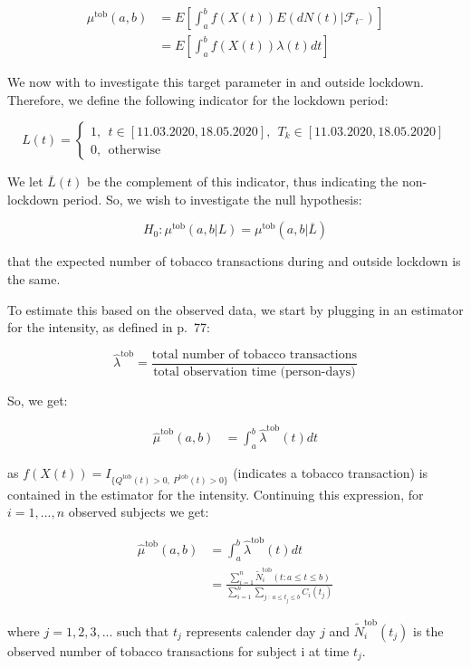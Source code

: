 \documentclass[
  11pt,
]{article}
\begin{document}
\begin{align*}
\mu^{\text{tob}}(a, b) &= E \left[\int_a^b f(X(t)) E(dN(t) | \mathcal{F}_{t^-}) \right] \\
&= E \left[\int_a^b f(X(t)) \lambda (t) dt \right]
\end{align*}

We now with to investigate this target parameter in and outside
lockdown. Therefore, we define the following indicator for the lockdown
period:

\[
L(t) = \begin{cases} 1, \ \  t\in [11.03.2020, 18.05.2020], \ \ T_k \in  [11.03.2020, 18.05.2020] \\
0, \ \ \text{otherwise}
\end{cases}
\]

We let \(\overline{L}(t)\) be the complement of this indicator, thus
indicating the non-lockdown period. So, we wish to investigate the null
hypothesis:

\[
H_0: \mu^{\text{tob}}(a,b | L)=\mu^{\text{tob}}(a,b | \overline{L})
\]

that the expected number of tobacco transactions during and outside
lockdown is the same.

To estimate this based on the observed data, we start by plugging in an
estimator for the intensity, as defined in \cite{marubini} p.~77:

\[
\hat{\lambda}^{\text{tob}}=\frac{\text{total number of tobacco transactions}}{\text{total observation time (person-days)}}
\]

So, we get:

\begin{align*}
\hat{\mu}^{\text{tob}}(a, b) &= \int_a^b \hat{\lambda}^{\text{tob}} (t) dt
\end{align*}

as \(f(X(t)) = I_{\{Q^{\text{tob}}(t) > 0, \ P^{\text{tob}}(t) > 0 \}}\)
(indicates a tobacco transaction) is contained in the estimator for the
intensity. Continuing this expression, for \(i=1,...,n\) observed
subjects we get:

\begin{align*}
\hat{\mu}^{\text{tob}}(a, b) &= \int_a^b \hat{\lambda}^{\text{tob}} (t) dt \\
&=\frac{\sum_{i=1}^n \tilde{N}_i^{\text{tob}}(t: a \leq t \leq b)}{\sum_{i=1}^n \sum_{j \ : \ a \leq t_j \leq b} C_i(t_j)}
\end{align*}

where \(j=1,2,3,...\) such that \(t_j\) represents calender day \(j\)
and \(\tilde{N}_i^{\text{tob}}(t_j)\) is the observed number of tobacco
transactions for subject i at time \(t_j\).
\end{document}
